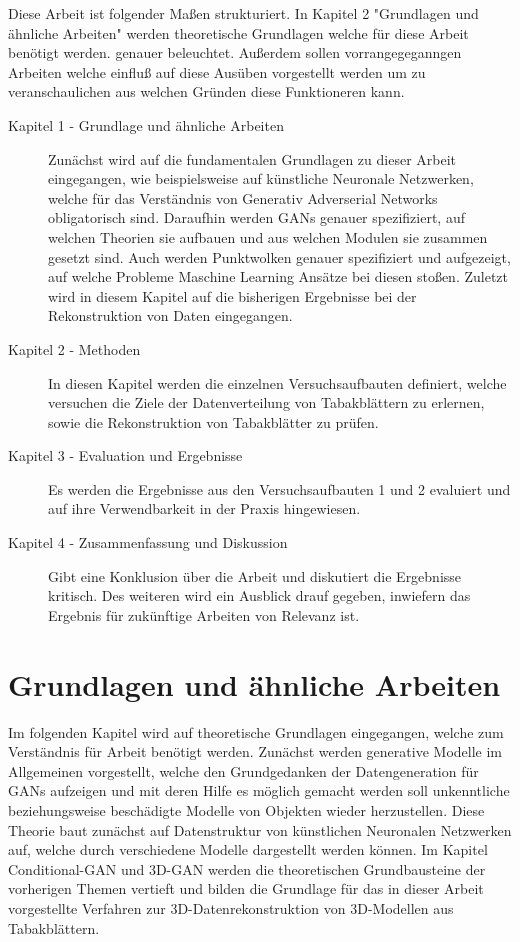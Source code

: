 \documentclass{llncs}
\begin{document}
Diese Arbeit ist folgender Maßen strukturiert. In Kapitel 2 "Grundlagen und ähnliche Arbeiten" werden theoretische Grundlagen welche für diese Arbeit benötigt werden. genauer beleuchtet. Außerdem sollen vorrangegeganngen Arbeiten welche einfluß auf diese Ausüben vorgestellt werden um zu veranschaulichen aus welchen Gründen diese Funktioneren kann.
\\
\begin{description}
\item[Kapitel 1 - Grundlage und ähnliche Arbeiten] Zunächst wird auf die fundamentalen Grundlagen zu dieser Arbeit eingegangen, wie beispielsweise auf künstliche Neuronale Netzwerken, welche für das Verständnis von Generativ Adverserial Networks obligatorisch sind. Daraufhin werden GANs genauer spezifiziert, auf welchen Theorien sie aufbauen und aus welchen Modulen sie zusammen gesetzt sind. Auch werden Punktwolken genauer spezifiziert und aufgezeigt, auf welche Probleme Maschine Learning Ansätze bei diesen stoßen. Zuletzt wird in diesem Kapitel auf die bisherigen Ergebnisse bei der Rekonstruktion von Daten eingegangen.\\
\item[Kapitel 2 - Methoden] In diesen Kapitel werden die einzelnen Versuchsaufbauten definiert, welche versuchen die Ziele der Datenverteilung von Tabakblättern zu erlernen, sowie die Rekonstruktion von Tabakblätter zu prüfen.\\
\item[Kapitel 3 - Evaluation und Ergebnisse] Es werden die Ergebnisse aus den Versuchsaufbauten 1 und 2 evaluiert und auf ihre Verwendbarkeit in der Praxis hingewiesen.\\
\item[Kapitel 4 - Zusammenfassung und Diskussion] Gibt eine Konklusion über die Arbeit und diskutiert die Ergebnisse kritisch. Des weiteren wird ein Ausblick drauf gegeben, inwiefern das Ergebnis für zukünftige Arbeiten von Relevanz ist. 
\end{description}

\section{Grundlagen und ähnliche Arbeiten}

Im folgenden Kapitel wird auf theoretische Grundlagen eingegangen, welche zum Verständnis für Arbeit benötigt werden. Zunächst werden  generative Modelle im Allgemeinen vorgestellt, welche den Grundgedanken der Datengeneration für GANs aufzeigen und mit deren Hilfe es möglich gemacht werden soll unkenntliche beziehungsweise beschädigte Modelle von Objekten wieder herzustellen. Diese Theorie baut zunächst auf Datenstruktur von künstlichen Neuronalen Netzwerken auf, welche durch verschiedene Modelle dargestellt werden können. Im Kapitel Conditional-GAN und 3D-GAN werden die theoretischen Grundbausteine der vorherigen Themen vertieft und bilden die Grundlage für das in dieser Arbeit vorgestellte Verfahren zur 3D-Datenrekonstruktion von 3D-Modellen aus Tabakblättern. 
\end{document}
